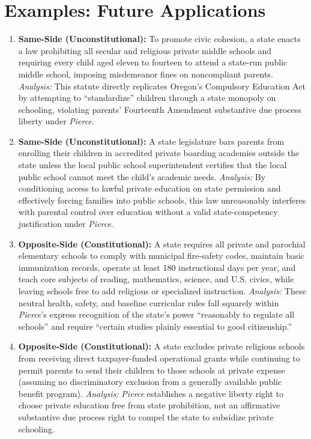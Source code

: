 \documentclass[12pt]{article}
\begin{document}
\section{Examples: Future Applications}
\begin{enumerate}
    \item \textbf{Same-Side (Unconstitutional):} To promote civic cohesion, a state enacts a law prohibiting all secular and religious private middle schools and requiring every child aged eleven to fourteen to attend a state-run public middle school, imposing misdemeanor fines on noncompliant parents. \textit{Analysis:} This statute directly replicates Oregon's Compulsory Education Act by attempting to ``standardize'' children through a state monopoly on schooling, violating parents' Fourteenth Amendment substantive due process liberty under \textit{Pierce}.
    \item \textbf{Same-Side (Unconstitutional):} A state legislature bars parents from enrolling their children in accredited private boarding academies outside the state unless the local public school superintendent certifies that the local public school cannot meet the child's academic needs. \textit{Analysis:} By conditioning access to lawful private education on state permission and effectively forcing families into public schools, this law unreasonably interferes with parental control over education without a valid state-competency justification under \textit{Pierce}.
    \item \textbf{Opposite-Side (Constitutional):} A state requires all private and parochial elementary schools to comply with municipal fire-safety codes, maintain basic immunization records, operate at least 180 instructional days per year, and teach core subjects of reading, mathematics, science, and U.S. civics, while leaving schools free to add religious or specialized instruction. \textit{Analysis:} These neutral health, safety, and baseline curricular rules fall squarely within \textit{Pierce}'s express recognition of the state's power ``reasonably to regulate all schools'' and require ``certain studies plainly essential to good citizenship.''
    \item \textbf{Opposite-Side (Constitutional):} A state excludes private religious schools from receiving direct taxpayer-funded operational grants while continuing to permit parents to send their children to those schools at private expense (assuming no discriminatory exclusion from a generally available public benefit program). \textit{Analysis:} \textit{Pierce} establishes a negative liberty right to choose private education free from state prohibition, not an affirmative substantive due process right to compel the state to subsidize private schooling.

\end{enumerate}
\end{document}
